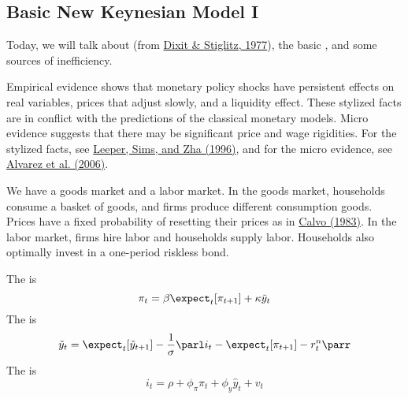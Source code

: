 \documentclass[10pt]{article}
\begin{document}
\subsection{Basic New Keynesian Model I}\label{subsec:3}

Today, we will talk about  (from \href{https://www.jstor.org/stable/1831401?seq=2}{Dixit \& Stiglitz, 1977}), the basic , and some sources of inefficiency.


\begin{remark}
	Empirical evidence shows that monetary policy shocks have persistent effects on real variables, prices that adjust slowly, and a liquidity effect. These stylized facts are in conflict with the predictions of the classical monetary models. Micro evidence suggests that there may be significant price and wage rigidities. For the stylized facts, see \href{https://www.brookings.edu/wp-content/uploads/1996/06/1996b_bpea_leeper_sims_zha_hall_bernanke.pdf}{Leeper, Sims, and Zha (1996)}, and for the micro evidence, see \href{https://www.econstor.eu/bitstream/10419/19630/1/200602dkp.pdf}{Alvarez et al. (2006)}.
\end{remark}

\begin{model}
	 We have a goods market and a labor market. In the goods market, households consume a basket of goods, and firms produce different consumption goods. Prices have a fixed probability of resetting their prices as in \href{https://www.sciencedirect.com/science/article/pii/0304393283900600}{Calvo (1983)}. In the labor market, firms hire labor and households supply labor. Households also optimally invest in a one-period riskless bond. 
	
	\begin{definition}
		The  is \[\pi_t = \beta \expect_t [\pi_{t+1}] + \kappa \tilde{y}_t\]The  is \[\tilde{y}_t = \expect_t[\tilde{y}_{t+1}] - \frac{1}{\sigma} \parl i_t - \expect_t[\pi_{t+1}] - r_t^n\parr\]The  is \[i_t = \rho + \phi_\pi \pi_t + \phi_y \hat{y}_t + v_t\]
	\end{definition}
\end{model}
\end{document}
